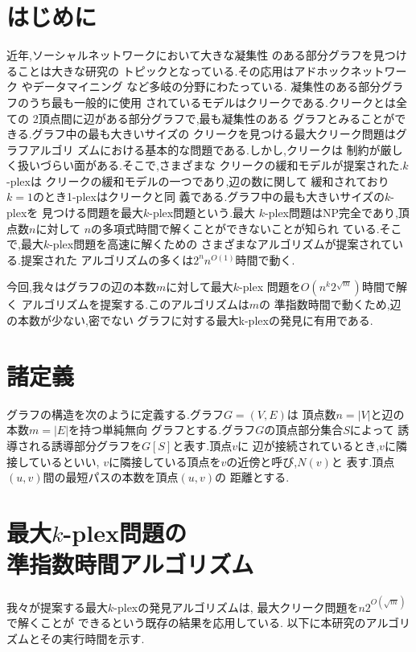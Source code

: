 \documentclass[a4j,twoside]{jarticle}
\begin{document}
\twocolumn[\vspace*{9mm}]     %
\begin{論文概要}              %
\setcounter{page}{2}          %

\section{はじめに}
近年,ソーシャルネットワークにおいて大きな凝集性
のある部分グラフを見つけることは大きな研究の
トピックとなっている.その応用はアドホックネットワーク \cite{chen2004clustering} 
やデータマイニング \cite{washio2003state} など多岐の分野にわたっている.
凝集性のある部分グラフのうち最も一般的に使用
されているモデルはクリークである.クリークとは全ての
2頂点間に辺がある部分グラフで,最も凝集性のある
グラフとみることができる.グラフ中の最も大きいサイズの
クリークを見つける最大クリーク問題はグラフアルゴリ
ズムにおける基本的な問題である.しかし,クリークは
制約が厳しく扱いづらい面がある.そこで,さまざまな
クリークの緩和モデルが提案された.$k$-plexは
クリークの緩和モデルの一つであり,辺の数に関して
緩和されており$k=1$のとき1-plexはクリークと同
義である.グラフ中の最も大きいサイズの$k$-plexを
見つける問題を最大$k$-plex問題という.最大
$k$-plex問題はNP完全であり,頂点数$n$に対して
$n$の多項式時間で解くことができないことが知られ
ている.そこで,最大$k$-plex問題を高速に解くための
さまざまなアルゴリズムが提案されている.提案された
アルゴリズムの多くは$2^{n}n^{O(1)}$時間で動く.

今回,我々はグラフの辺の本数$m$に対して最大$k$-plex
問題を$O(n^{k}2^{\sqrt{m}})$時間で解く
アルゴリズムを提案する.このアルゴリズムは$m$の
準指数時間で動くため,辺の本数が少ない,密でない
グラフに対する最大k-plexの発見に有用である.  

\section{諸定義}
グラフの構造を次のように定義する.グラフ$G=(V,E)$は
頂点数$n=|V|$と辺の本数$m=|E|$を持つ単純無向
グラフとする.グラフ$G$の頂点部分集合$S$によって
誘導される誘導部分グラフを$G[S]$と表す.頂点$v$に
辺が接続されているとき,$v$に隣接しているといい,
$v$に隣接している頂点を$v$の近傍と呼び,$N(v)$と
表す.頂点$(u,v)$間の最短パスの本数を頂点$(u,v)$の
距離とする.

\section{最大$k$-plex問題の \\ 準指数時間アルゴリズム}
我々が提案する最大$k$-plexの発見アルゴリズムは,
最大クリーク問題を$n2^{O(\sqrt{m})}$で解くことが
できるという既存の結果を応用している. \cite{fomin2010exact}
以下に本研究のアルゴリズムとその実行時間を示す.


\end{論文概要}
\end{document}
